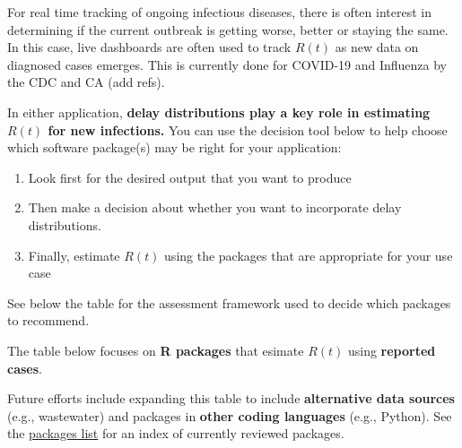 \documentclass[
  letterpaper,
  DIV=11,
  numbers=noendperiod]{scrreprt}
\providecommand{\tightlist}{%
  \setlength{\itemsep}{0pt}\setlength{\parskip}{0pt}}\usepackage{longtable,booktabs,array}
\begin{document}
For real time tracking of ongoing infectious diseases, there is often
interest in determining if the current outbreak is getting worse, better
or staying the same. In this case, live dashboards are often used to
track \(R(t)\) as new data on diagnosed cases emerges. This is currently
done for COVID-19 and Influenza by the CDC and CA (add refs).

In either application, \textbf{delay distributions play a key role in
estimating \(R(t)\) for new infections.} You can use the decision tool
below to help choose which software package(s) may be right for your
application:

\begin{enumerate}
\def\labelenumi{\arabic{enumi}.}
\tightlist
\item
  Look first for the desired output that you want to produce
\item
  Then make a decision about whether you want to incorporate delay
  distributions.
\item
  Finally, estimate \(R(t)\) using the packages that are appropriate for
  your use case
\end{enumerate}

See below the table for the assessment framework used to decide which
packages to recommend.

\begin{tcolorbox}[enhanced jigsaw, opacityback=0, title=\textcolor{quarto-callout-note-color}{\faInfo}\hspace{0.5em}{Focus of this matrix}, leftrule=.75mm, toprule=.15mm, bottomrule=.15mm, coltitle=black, opacitybacktitle=0.6, toptitle=1mm, colframe=quarto-callout-note-color-frame, colback=white, rightrule=.15mm, colbacktitle=quarto-callout-note-color!10!white, titlerule=0mm, breakable, bottomtitle=1mm, arc=.35mm, left=2mm]

The table below focuses on \textbf{R packages} that esimate \(R(t)\)
using \textbf{reported cases}.

Future efforts include expanding this table to include
\textbf{alternative data sources} (e.g., wastewater) and packages in
\textbf{other coding languages} (e.g., Python). See the
\href{packages.qmd}{packages list} for an index of currently reviewed
packages.

\end{tcolorbox}
\end{document}
